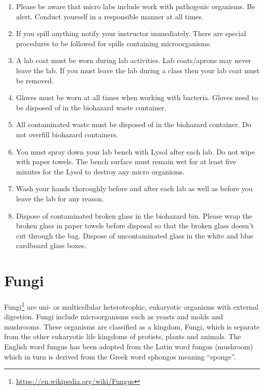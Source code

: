 \documentclass[]{book}
\providecommand{\tightlist}{%
  \setlength{\itemsep}{0pt}\setlength{\parskip}{0pt}}
\let\rmarkdownfootnote\footnote%
\def\footnote{\protect\rmarkdownfootnote}
\renewcommand{\href}[2]{#2\footnote{\url{#1}}}
\theoremstyle{definition}
\theoremstyle{definition}
\theoremstyle{definition}
\theoremstyle{remark}
\begin{document}
\begin{enumerate}
\def\labelenumi{\arabic{enumi}.}
\setcounter{enumi}{37}
\tightlist
\item
  Please be aware that micro labs include work with pathogenic
  organisms. Be alert. Conduct yourself in a responsible manner at all
  times.
\item
  If you spill anything notify your instructor immediately. There are
  special procedures to be followed for spills containing
  microorganisms.
\item
  A lab coat must be worn during lab activities. Lab coats/aprons may
  never leave the lab. If you must leave the lab during a class then
  your lab coat must be removed.
\item
  Gloves must be worn at all times when working with bacteria. Gloves
  need to be disposed of in the biohazard waste container.
\item
  All contaminated waste must be disposed of in the biohazard container.
  Do not overfill biohazard containers.
\item
  You must spray down your lab bench with Lysol after each lab. Do not
  wipe with paper towels. The bench surface must remain wet for at least
  five minutes for the Lysol to destroy any micro organisms.
\item
  Wash your hands thoroughly before and after each lab as well as before
  you leave the lab for any reason.
\item
  Dispose of contaminated broken glass in the biohazard bin. Please wrap
  the broken glass in paper towels before disposal so that the broken
  glass doesn't cut through the bag. Dispose of uncontaminated glass in
  the white and blue cardboard glass boxes.
\end{enumerate}

\chapter{Fungi}\label{fungi}

\href{https://en.wikipedia.org/wiki/Fungus}{Fungi} are uni- or
multicellular heterotrophic, eukaryotic organisms with external
digestion. Fungi include microorganisms such as yeasts and molds and
mushrooms. These organisms are classified as a kingdom, Fungi, which is
separate from the other eukaryotic life kingdoms of protists, plants and
animals. The English word fungus has been adopted from the Latin word
fungus (mushroom) which in turn is derived from the Greek word sphongos
meaning ``sponge''.
\end{document}
